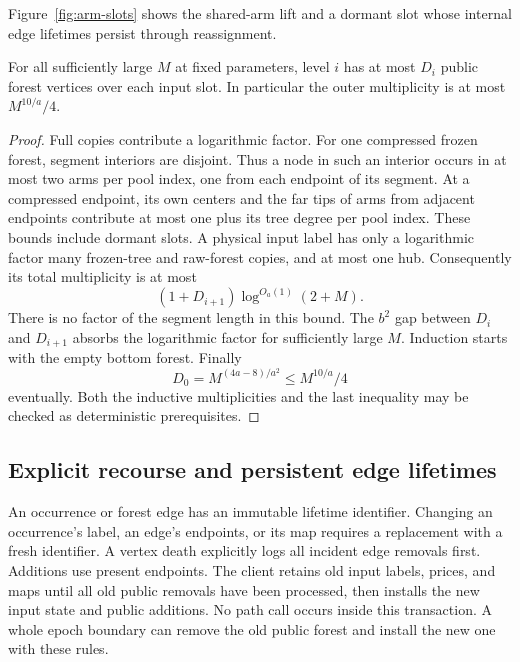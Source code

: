Figure~\ref{fig:arm-slots} shows the shared-arm lift and a dormant slot
whose internal edge lifetimes persist through reassignment.

\clearpage

\begin{lemma}
\label{update:multiplicity}
For all sufficiently large $M$ at fixed parameters, level $i$
has at most $D_i$ public forest vertices over each input slot.
In particular the outer multiplicity is at most $M^{10/a}/4$.
\end{lemma}

\begin{proof}
Full copies contribute a logarithmic factor.  For one compressed
frozen forest, segment interiors are disjoint.  Thus a node in
such an interior occurs in at most two arms per pool index, one
from each endpoint of its segment.  At a compressed endpoint,
its own centers and the far tips of arms from adjacent endpoints
contribute at most one plus its tree degree per pool index.
These bounds include dormant slots.  A physical input label has
only a logarithmic factor many frozen-tree and raw-forest copies,
and at most one hub.  Consequently its total multiplicity is
at most
\begin{equation}
       (1+D_{i+1})\log^{O_a(1)}(2+M).
 \label{update:multiplicity-step}
\end{equation}
There is no factor of the segment length in this bound.  The
$b^2$ gap between $D_i$ and $D_{i+1}$ absorbs the logarithmic
factor for sufficiently large $M$.  Induction starts with the
empty bottom forest.  Finally
\[
 D_0=M^{(4a-8)/a^2}\le M^{10/a}/4
\]
eventually.  Both the inductive multiplicities and the last
inequality may be checked as deterministic prerequisites.
\end{proof}

\subsection{Explicit recourse and persistent edge lifetimes}

An occurrence or forest edge has an immutable lifetime identifier.
Changing an occurrence's label, an edge's endpoints, or its map
requires a replacement with a fresh identifier.  A vertex death
explicitly logs all incident edge removals first.  Additions use
present endpoints.  The client retains old input labels, prices,
and maps until all old public removals have been processed, then
installs the new input state and public additions.  No path call
occurs inside this transaction.  A whole epoch boundary can remove
the old public forest and install the new one with these rules.

